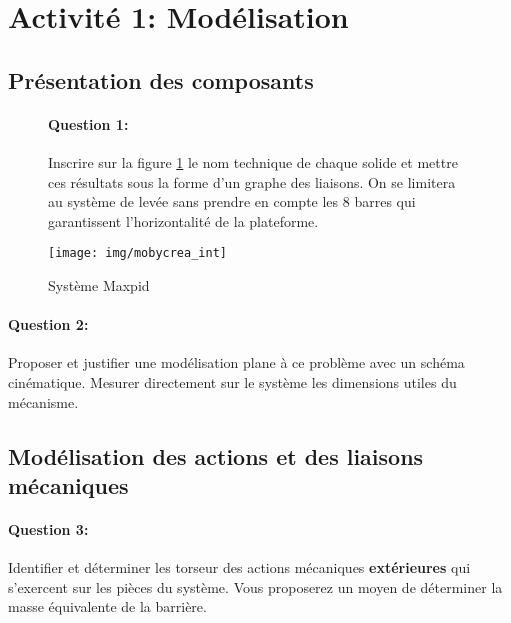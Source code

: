 

\section{Activité 1: Modélisation}

\subsection{Présentation des composants}

\begin{figure}[!h]
 \begin{minipage}{0.45\linewidth}
\paragraph{Question 1:} Inscrire sur la figure \ref{img1} le nom technique de chaque solide et mettre ces résultats sous la forme d'un graphe des liaisons. On se limitera au système de levée sans prendre en compte les 8 barres qui garantissent l'horizontalité de la plateforme.
 \end{minipage}
  \hfill
 \begin{minipage}{0.45\linewidth}
  \centering\texttt{[image: img/mobycrea\_int]}
  \caption{Système Maxpid}
  \label{img1}
 \end{minipage}
\end{figure}

\paragraph{Question 2:} Proposer et justifier une modélisation plane à ce problème avec un schéma cinématique. Mesurer directement sur le système les dimensions utiles du mécanisme.

\vspace{6cm}

\subsection{Modélisation des actions et des liaisons mécaniques}

\paragraph{Question 3:} Identifier et déterminer les torseur des actions mécaniques \textbf{extérieures} qui s'exercent sur les pièces du système. Vous proposerez un moyen de déterminer la masse équivalente de la barrière.



